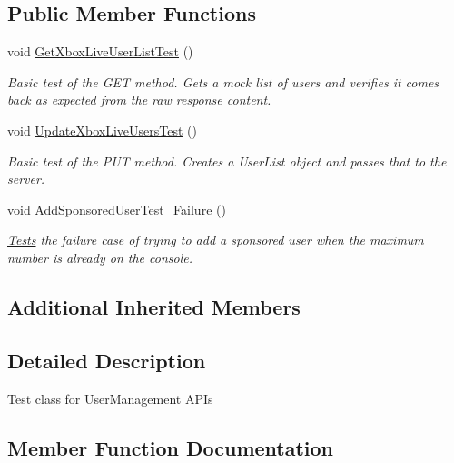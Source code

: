 \subsection*{Public Member Functions}
\begin{DoxyCompactItemize}
\item 
void \hyperlink{class_microsoft_1_1_tools_1_1_windows_device_portal_1_1_tests_1_1_user_management_tests_a2df84b32707693bb933031e1a631cb38}{Get\+Xbox\+Live\+User\+List\+Test} ()
\begin{DoxyCompactList}\small\item\em Basic test of the G\+ET method. Gets a mock list of users and verifies it comes back as expected from the raw response content. \end{DoxyCompactList}\item 
void \hyperlink{class_microsoft_1_1_tools_1_1_windows_device_portal_1_1_tests_1_1_user_management_tests_abc828aa5c95b8a7640e2686031849dd0}{Update\+Xbox\+Live\+Users\+Test} ()
\begin{DoxyCompactList}\small\item\em Basic test of the P\+UT method. Creates a User\+List object and passes that to the server. \end{DoxyCompactList}\item 
void \hyperlink{class_microsoft_1_1_tools_1_1_windows_device_portal_1_1_tests_1_1_user_management_tests_a755017f56b57ae66a8825a9afda5a354}{Add\+Sponsored\+User\+Test\+\_\+\+Failure} ()
\begin{DoxyCompactList}\small\item\em \hyperlink{namespace_microsoft_1_1_tools_1_1_windows_device_portal_1_1_tests}{Tests} the failure case of trying to add a sponsored user when the maximum number is already on the console. \end{DoxyCompactList}\end{DoxyCompactItemize}
\subsection*{Additional Inherited Members}


\subsection{Detailed Description}
Test class for User\+Management A\+P\+Is 



\subsection{Member Function Documentation}
